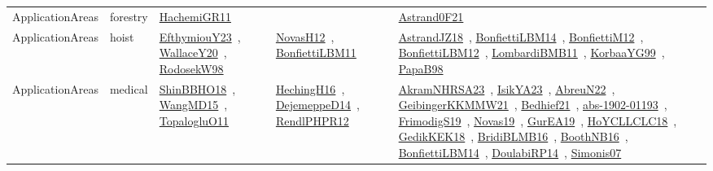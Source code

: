 {\begin{longtable}{lp{3cm}>{\raggedright\arraybackslash}p{6cm}>{\raggedright\arraybackslash}p{6cm}>{\raggedright\arraybackslash}p{8cm}}
ApplicationAreas & forestry & \href{articles/HachemiGR11.pdf}{HachemiGR11}~\cite{HachemiGR11} &  & \href{papers/Astrand0F21.pdf}{Astrand0F21}~\cite{Astrand0F21}\\
ApplicationAreas & hoist & \href{papers/EfthymiouY23.pdf}{EfthymiouY23}~\cite{EfthymiouY23}, \href{articles/WallaceY20.pdf}{WallaceY20}~\cite{WallaceY20}, \href{papers/RodosekW98.pdf}{RodosekW98}~\cite{RodosekW98} & \href{articles/NovasH12.pdf}{NovasH12}~\cite{NovasH12}, \href{papers/BonfiettiLBM11.pdf}{BonfiettiLBM11}~\cite{BonfiettiLBM11} & \href{papers/AstrandJZ18.pdf}{AstrandJZ18}~\cite{AstrandJZ18}, \href{articles/BonfiettiLBM14.pdf}{BonfiettiLBM14}~\cite{BonfiettiLBM14}, \href{papers/BonfiettiM12.pdf}{BonfiettiM12}~\cite{BonfiettiM12}, \href{papers/BonfiettiLBM12.pdf}{BonfiettiLBM12}~\cite{BonfiettiLBM12}, \href{papers/LombardiBMB11.pdf}{LombardiBMB11}~\cite{LombardiBMB11}, \href{papers/KorbaaYG99.pdf}{KorbaaYG99}~\cite{KorbaaYG99}, \href{articles/PapaB98.pdf}{PapaB98}~\cite{PapaB98}\\
ApplicationAreas & medical & \href{articles/ShinBBHO18.pdf}{ShinBBHO18}~\cite{ShinBBHO18}, \href{articles/WangMD15.pdf}{WangMD15}~\cite{WangMD15}, \href{articles/TopalogluO11.pdf}{TopalogluO11}~\cite{TopalogluO11} & \href{papers/HechingH16.pdf}{HechingH16}~\cite{HechingH16}, \href{papers/DejemeppeD14.pdf}{DejemeppeD14}~\cite{DejemeppeD14}, \href{papers/RendlPHPR12.pdf}{RendlPHPR12}~\cite{RendlPHPR12} & \href{articles/AkramNHRSA23.pdf}{AkramNHRSA23}~\cite{AkramNHRSA23}, \href{articles/IsikYA23.pdf}{IsikYA23}~\cite{IsikYA23}, \href{articles/AbreuN22.pdf}{AbreuN22}~\cite{AbreuN22}, \href{papers/GeibingerKKMMW21.pdf}{GeibingerKKMMW21}~\cite{GeibingerKKMMW21}, \href{articles/Bedhief21.pdf}{Bedhief21}~\cite{Bedhief21}, \href{articles/abs-1902-01193.pdf}{abs-1902-01193}~\cite{abs-1902-01193}, \href{papers/FrimodigS19.pdf}{FrimodigS19}~\cite{FrimodigS19}, \href{articles/Novas19.pdf}{Novas19}~\cite{Novas19}, \href{articles/GurEA19.pdf}{GurEA19}~\cite{GurEA19}, \href{papers/HoYCLLCLC18.pdf}{HoYCLLCLC18}~\cite{HoYCLLCLC18}, \href{articles/GedikKEK18.pdf}{GedikKEK18}~\cite{GedikKEK18}, \href{articles/BridiBLMB16.pdf}{BridiBLMB16}~\cite{BridiBLMB16}, \href{papers/BoothNB16.pdf}{BoothNB16}~\cite{BoothNB16}, \href{articles/BonfiettiLBM14.pdf}{BonfiettiLBM14}~\cite{BonfiettiLBM14}, \href{papers/DoulabiRP14.pdf}{DoulabiRP14}~\cite{DoulabiRP14}, \href{articles/Simonis07.pdf}{Simonis07}~\cite{Simonis07}\\

\end{longtable}}
